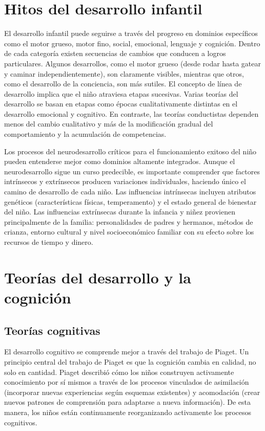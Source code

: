 \documentclass[11pt,letterpaper]{report}
\begin{document}
\section{Hitos del desarrollo infantil}
El desarrollo infantil puede seguirse a través del progreso en dominios
específicos como el motor grueso, motor fino, social, emocional, lenguaje y
cognición. Dentro de cada categoría existen secuencias de cambios que conducen
a logros particulares. Algunos desarrollos, como el motor grueso (desde rodar
hasta gatear y caminar independientemente), son claramente visibles, mientras
que otros, como el desarrollo de la conciencia, son más sutiles. El concepto de
línea de desarrollo implica que el niño atraviesa etapas sucesivas. Varias
teorías del desarrollo se basan en etapas como épocas cualitativamente
distintas en el desarrollo emocional y cognitivo. En contraste, las teorías
conductistas dependen menos del cambio cualitativo y más de la modificación
gradual del comportamiento y la acumulación de competencias.
\cite{Nelson19}

Los procesos del neurodesarrollo críticos para el funcionamiento exitoso del
niño pueden entenderse mejor como dominios altamente integrados. Aunque el
neurodesarrollo sigue un curso predecible, es importante comprender que
factores intrínsecos y extrínsecos producen variaciones individuales, haciendo
único el camino de desarrollo de cada niño. Las influencias intrínsecas
incluyen atributos genéticos (características físicas, temperamento) y el
estado general de bienestar del niño. Las influencias extrínsecas durante la
infancia y niñez provienen principalmente de la familia: personalidades de
padres y hermanos, métodos de crianza, entorno cultural y nivel
socioeconómico familiar con su efecto sobre los recursos de tiempo y dinero.
\cite{Gerber2010}

\section{Teorías del desarrollo y la cognición}
\subsection{Teorías cognitivas}
El desarrollo cognitivo se comprende mejor a través del trabajo de Piaget. Un
principio central del trabajo de Piaget es que la cognición cambia en calidad,
no solo en cantidad. Piaget describió cómo los niños construyen activamente
conocimiento por sí mismos a través de los procesos vinculados de asimilación
(incorporar nuevas experiencias según esquemas existentes) y acomodación (crear
nuevos patrones de comprensión para adaptarse a nueva información). De esta
manera, los niños están continuamente reorganizando activamente los procesos
cognitivos. \cite{Nelson19}
\end{document}
